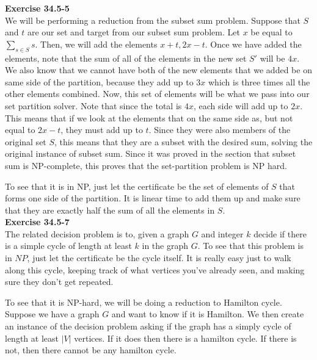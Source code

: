 \documentclass{article}
\begin{document}
\noindent\textbf{Exercise 34.5-5}\\

We will be performing a reduction from the subset sum problem. Suppose that $S$ and $t$ are our set and target from our subset sum problem. Let $x$ be equal to $ \sum_{s\in S} s$. Then, we will add the elements $x+t, 2x-t$. Once we have added the elements, note that the sum of all of the elements in the new set $S'$ will be $4x$. We also know that we cannot have both of the new elements that we added be on same side of the partition, because they add up to $3x$ which is three times all the other elements combined. Now, this set of elements will be what we pass into our set partition solver. Note that since the total is $4x$, each side will add up to $2x$. This means that if we look at the elements that on the same side as, but not equal to $2x-t$, they must add up to $t$. Since they were also members of the original set $S$, this means that they are a subset with the desired sum, solving the original instance of subset sum. Since it was proved in the section that subset sum is NP-complete, this proves that the set-partition problem is NP hard. 

To see that it is in NP, just let the certificate be the set of elements of $S$ that forms one side of the partition. It is linear time to add them up and make sure that they are exactly half the sum of all the elements in $S$.\\



\noindent\textbf{Exercise 34.5-7}\\

The related decision problem is to, given a graph $G$ and integer $k$ decide if there is a simple cycle of length at least $k$ in the graph $G$. To see that this problem is in $NP$, just let the certificate be the cycle itself. It is really easy just to walk along this cycle, keeping track of what vertices you've already seen, and making sure they don't get repeated.

To see that it is NP-hard, we will be doing a reduction to Hamilton cycle. Suppose we have a graph $G$ and want to know if it is Hamilton. We then create an instance of the decision problem asking if the graph has a simply cycle of length at least $|V|$ vertices. If it does then there is a hamilton cycle. If there is not, then there cannot be any hamilton cycle.\\
\end{document}
